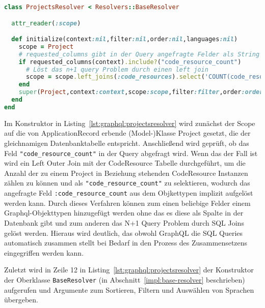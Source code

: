 \begin{lstlisting}[language=Ruby,float=h!,caption={\emph{"Plain Old Ruby Object"} zum Auflösung der Query \lstinline|:projects|. \lstinline|/graphql/resolvers/projects_resolver.rb|}, label={lst:graphql:projectsresolver}]
class ProjectsResolver < Resolvers::BaseResolver

  attr_reader(:scope)

  def initialize(context:nil,filter:nil,order:nil,languages:nil)
    scope = Project
    # requested_columns gibt in der Query angefragte Felder als String Array zurück
    if requested_columns(context).include?("code_resource_count")
      # Löst das n+1 query Problem durch einen left join
      scope = scope.left_joins(:code_resources).select('COUNT(code_resources) AS code_resource_count').group('projects.id')
    end
    super(Project,context:context,scope:scope,filter:filter,order:order,languages:languages,order_dir: "asc",order_field:"name")
  end
end
\end{lstlisting}

Im Konstruktor in Listing~\ref{lst:graphql:projectsresolver} wird zunächst der Scope auf die von ApplicationRecord erbende (Model-)Klasse Project gesetzt, die der gleichnamigen Datenbanktabelle entspricht. Anschließend wird geprüft, ob das Feld \lstinline|"code_resource_count"| in der Query abgefragt wird. Wenn das der Fall ist wird ein Left Outer Join mit der CodeResource Tabelle durchgeführt, um die Anzahl der zu einem Project in Beziehung stehenden CodeResource Instanzen zählen zu können und als \lstinline|"code_resource_count"| zu selektieren, wodurch das angefragte Feld \lstinline|:code_resource_count| aus dem Objkettypen  implizit aufgelöst werden kann. Durch dieses Verfahren können zum einen beliebige Felder einem Graphql-Objekttypen hinzugefügt werden ohne das es diese als Spalte in der Datenbank gibt und zum anderen das N+1 Query Problem durch SQL Joins gelöst werden. 
Hieraus wird deutlich, das obwohl GraphQL die SQL Queries automatisch zusammen stellt bei Bedarf in den Prozess des Zusammensetzens eingegriffen werden kann.

Zuletzt wird in Zeile 12 in Listing~\ref{lst:graphql:projectsresolver} der Konstruktor der Oberklasse \lstinline|BaseResolver| (in Abschnitt~\ref{impl:base-resolver} beschrieben) aufgerufen und  Argumente zum Sortieren, Filtern und Auswählen von Sprachen übergeben.

